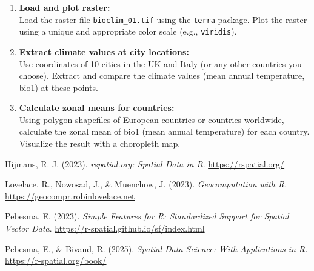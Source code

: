 \documentclass[
]{book}
\begin{document}
\begin{tcolorbox}[enhanced jigsaw, left=2mm, bottomtitle=1mm, colframe=quarto-callout-note-color-frame, title=\textcolor{quarto-callout-note-color}{\faInfo}\hspace{0.5em}{Exercises: Load and Inspect a Raster}, breakable, coltitle=black, leftrule=.75mm, bottomrule=.15mm, arc=.35mm, toprule=.15mm, colback=white, toptitle=1mm, rightrule=.15mm, titlerule=0mm, opacityback=0, colbacktitle=quarto-callout-note-color!10!white, opacitybacktitle=0.6]

\begin{enumerate}
\def\labelenumi{\arabic{enumi}.}
\item
  \textbf{Load and plot raster:}\\
  Load the raster file \texttt{bioclim\_01.tif} using the \texttt{terra}
  package. Plot the raster using a unique and appropriate color scale
  (e.g., \texttt{viridis}).
\item
  \textbf{Extract climate values at city locations:}\\
  Use coordinates of 10 cities in the UK and Italy (or any other
  countries you choose). Extract and compare the climate values (mean
  annual temperature, bio1) at these points.
\item
  \textbf{Calculate zonal means for countries:}\\
  Using polygon shapefiles of European countries or countries worldwide,
  calculate the zonal mean of bio1 (mean annual temperature) for each
  country. Visualize the result with a choropleth map.
\end{enumerate}

\end{tcolorbox}

\begin{tcolorbox}[enhanced jigsaw, left=2mm, bottomtitle=1mm, colframe=quarto-callout-note-color-frame, title=\textcolor{quarto-callout-note-color}{\faInfo}\hspace{0.5em}{Useful sources}, breakable, coltitle=black, leftrule=.75mm, bottomrule=.15mm, arc=.35mm, toprule=.15mm, colback=white, toptitle=1mm, rightrule=.15mm, titlerule=0mm, opacityback=0, colbacktitle=quarto-callout-note-color!10!white, opacitybacktitle=0.6]

Hijmans, R. J. (2023). \emph{rspatial.org: Spatial Data in R}.
\url{https://rspatial.org/}

Lovelace, R., Nowosad, J., \& Muenchow, J. (2023). \emph{Geocomputation
with R}. \url{https://geocompr.robinlovelace.net}

Pebesma, E. (2023). \emph{Simple Features for R: Standardized Support
for Spatial Vector Data}.
\url{https://r-spatial.github.io/sf/index.html}

Pebesma, E., \& Bivand, R. (2025). \emph{Spatial Data Science: With
Applications in R.} \url{https://r-spatial.org/book/}

\end{tcolorbox}


\backmatter
\end{document}
